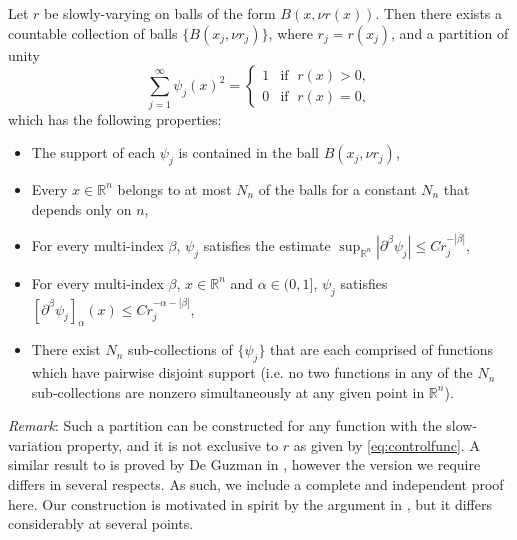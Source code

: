 \documentclass[oneside,hidelinks,indentfirst,10pt]{book}
\begin{document}
\begin{thm}\label{thm:party}
Let \(r\) be slowly-varying on balls of the form \(B(x,\nu r(x))\). Then there exists a countable collection of balls \(\{B(x_j,\nu r_j)\}\), where \(r_j=r(x_j)\), and a partition of unity
\begin{equation}\label{eq:pou2}
    \sum_{j=1}^\infty\psi_j(x)^2=
    \begin{cases}
    1 & \textrm{if }\;r(x)>0,\\
    0 & \textrm{if }\;r(x)=0,
    \end{cases}
\end{equation}
which has the following properties:
\begin{itemize}
    \item[(1)] The support of each \(\psi_j\) is contained in the ball \(B(x_j,\nu r_j)\),
    \item[(2)] Every \(x\in\mathbb{R}^n\) belongs to at most \(N_n\) of the balls for a constant \(N_n\) that depends only on \(n\),
    \item[(3)] For every multi-index \(\beta\), \(\psi_j\) satisfies the estimate \(\sup_{\mathbb{R}^n}|\partial^\beta\psi_j|\leq C r_j^{-|\beta|}\),
    \item[(4)] For every multi-index \(\beta\), \(x\in\mathbb{R}^n\) and \(\alpha\in(0,1]\), \(\psi_j\) satisfies \([\partial^\beta\psi_j]_{\alpha}(x)\leq Cr_j^{-\alpha-|\beta|}\),
    \item[(5)] There exist \(N_n\) sub-collections of \(\{\psi_j\}\) that are each comprised of functions which have pairwise disjoint support (i.e. no two functions in any of the \(N_n\) sub-collections are nonzero simultaneously at any given point in \(\mathbb{R}^n\)). 
\end{itemize}
\end{thm}

\medskip

\textit{Remark}: Such a partition can be constructed for any function with the slow-variation property, and it is not exclusive to \(r\) as given by \eqref{eq:controlfunc}. A similar result to  is proved by De Guzman in \cite[Lemma 1.2]{guzman}, however the version we require differs in several respects. As such, we include a complete and independent proof here. Our construction is motivated in spirit by the argument in \cite{Tataru}, but it differs considerably at several points.
\end{document}

